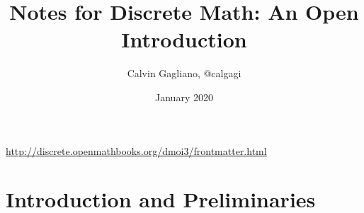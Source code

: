 \documentclass{article}
\title{Notes for Discrete Math: An Open Introduction}
\author{Calvin Gagliano, @calgagi}
\date{January 2020}
\begin{document}
\maketitle

\url{http://discrete.openmathbooks.org/dmoi3/frontmatter.html}

\tableofcontents


\section{Introduction and Preliminaries}



        
    
\end{document}
